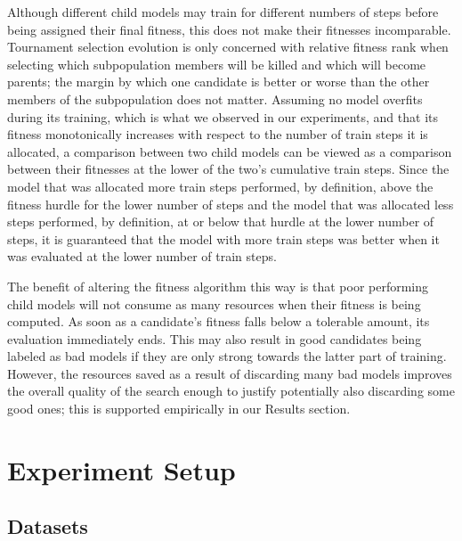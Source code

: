 \documentclass{article}
\begin{document}
Although different child models may train for different numbers of steps before being assigned their final fitness, this does not make their fitnesses incomparable. Tournament selection evolution is only concerned with relative fitness rank when selecting which subpopulation members will be killed and which will become parents; the margin by which one candidate is better or worse than the other members of the subpopulation does not matter. Assuming no model overfits during its training, which is what we observed in our experiments, and that its fitness monotonically increases with respect to the number of train steps it is allocated, a comparison between two child models can be viewed as a comparison between their fitnesses at the lower of the two's cumulative train steps. Since the model that was allocated more train steps performed, by definition, above the fitness hurdle for the lower number of steps and the model that was allocated less steps performed, by definition, at or below that hurdle at the lower number of steps, it is guaranteed that the model with more train steps was better when it was evaluated at the lower number of train steps.

The benefit of altering the fitness algorithm this way is that poor performing child models will not consume as many resources when their fitness is being computed. As soon as a candidate's fitness falls below a tolerable amount, its evaluation immediately ends. This may also result in good candidates being labeled as bad models if they are only strong towards the latter part of training. However, the resources saved as a result of discarding many bad models improves the overall quality of the search enough to justify potentially also discarding some good ones; this is supported empirically in our Results section.

\section{Experiment Setup}

\subsection{Datasets}
\end{document}

